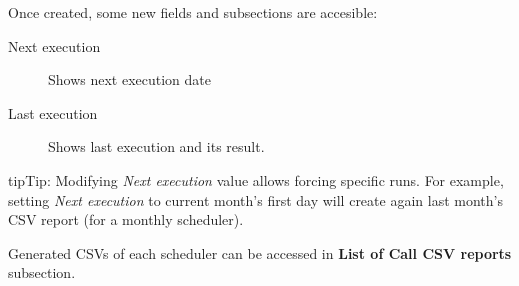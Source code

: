 \documentclass[letterpaper,10pt,english]{sphinxmanual}
\begin{document}
Once created, some new fields and subsections are accesible:
\begin{description}
\item[{Next execution}] \leavevmode{}\label{administration_portal/client/vpbx/calls/call_csv_schedulers:term-next-execution}
Shows next execution date

\item[{Last execution}] \leavevmode{}\label{administration_portal/client/vpbx/calls/call_csv_schedulers:term-last-execution}
Shows last execution and its result.

\end{description}

\begin{notice}{tip}{Tip:}
Modifying \emph{Next execution} value allows forcing specific runs. For example, setting \emph{Next execution} to
current month's first day will create again last month's CSV report (for a monthly scheduler).
\end{notice}

Generated CSVs of each scheduler can be accessed in \textbf{List of Call CSV reports} subsection.
\end{document}

